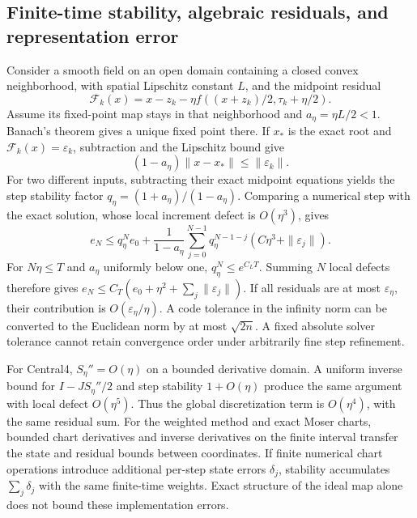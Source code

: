 \subsection{Finite-time stability, algebraic residuals, and representation error}
Consider a smooth field on an open domain containing a closed convex neighborhood, with spatial Lipschitz constant $L$, and the midpoint residual
\begin{equation}
 \mathcal F_k(x)=x-z_k-\eta f((x+z_k)/2,\tau_k+\eta/2).
 \label{eq:sup-midpoint-residual}
\end{equation}
Assume its fixed-point map stays in that neighborhood and $a_\eta=\eta L/2<1$. Banach's theorem gives a unique fixed point there. If $x_*$ is the exact root and $\mathcal F_k(x)=\varepsilon_k$, subtraction and the Lipschitz bound give
\begin{equation}
 (1-a_\eta)\|x-x_*\|\le\|\varepsilon_k\|.
 \label{eq:sup-residual-to-state}
\end{equation}
For two different inputs, subtracting their exact midpoint equations yields the step stability factor $q_\eta=(1+a_\eta)/(1-a_\eta)$. Comparing a numerical step with the exact solution, whose local increment defect is $O(\eta^3)$, gives
\begin{equation}
 e_N\le q_\eta^Ne_0+\frac{1}{1-a_\eta}
 \sum_{j=0}^{N-1}q_\eta^{N-1-j}(C\eta^3+\|\varepsilon_j\|).
 \label{eq:sup-error-sum}
\end{equation}
For $N\eta\le T$ and $a_\eta$ uniformly below one, $q_\eta^N\le e^{C_LT}$. Summing $N$ local defects therefore gives $e_N\le C_T(e_0+\eta^2+\sum_j\|\varepsilon_j\|)$. If all residuals are at most $\varepsilon_\eta$, their contribution is $O(\varepsilon_\eta/\eta)$. A code tolerance in the infinity norm can be converted to the Euclidean norm by at most $\sqrt{2n}$. A fixed absolute solver tolerance cannot retain convergence order under arbitrarily fine step refinement.

For Central4, $S_\eta''=O(\eta)$ on a bounded derivative domain. A uniform inverse bound for $I-JS_\eta''/2$ and step stability $1+O(\eta)$ produce the same argument with local defect $O(\eta^5)$. Thus the global discretization term is $O(\eta^4)$, with the same residual sum. For the weighted method and exact Moser charts, bounded chart derivatives and inverse derivatives on the finite interval transfer the state and residual bounds between coordinates. If finite numerical chart operations introduce additional per-step state errors $\delta_j$, stability accumulates $\sum_j\delta_j$ with the same finite-time weights. Exact structure of the ideal map alone does not bound these implementation errors.

